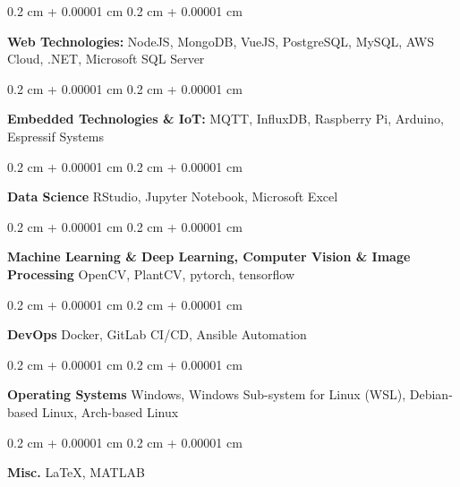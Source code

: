 \documentclass[10pt, letterpaper]{article}
\newenvironment{onecolentry}{
    \begin{adjustwidth}{
        0.2 cm + 0.00001 cm
    }{
        0.2 cm + 0.00001 cm
    }
}{
    \end{adjustwidth}
} %
\begin{document}
        \vspace{0.2 cm}

        \begin{onecolentry}
            \textbf{Web Technologies:} NodeJS, MongoDB, VueJS, PostgreSQL, MySQL, AWS Cloud, .NET, Microsoft SQL Server
        \end{onecolentry}

        \vspace{0.2 cm}

        \begin{onecolentry}
            \textbf{Embedded Technologies \& IoT:} MQTT, InfluxDB, Raspberry Pi, Arduino, Espressif Systems
        \end{onecolentry}

        \vspace{0.2 cm}

        \begin{onecolentry}
            \textbf{Data Science} RStudio, Jupyter Notebook, Microsoft Excel
        \end{onecolentry}

        \vspace{0.2 cm}

        \begin{onecolentry}
            \textbf{Machine Learning \& Deep Learning, Computer Vision \& Image Processing} OpenCV, PlantCV, pytorch, tensorflow 
        \end{onecolentry}

        \vspace{0.2 cm}

        \begin{onecolentry}
            \textbf{DevOps} Docker, GitLab CI/CD, Ansible Automation
        \end{onecolentry}

        \vspace{0.2 cm}

        \begin{onecolentry}
            \textbf{Operating Systems} Windows, Windows Sub-system for Linux (WSL), Debian-based Linux, Arch-based Linux
        \end{onecolentry}

        \vspace{0.2 cm}

        \begin{onecolentry}
            \textbf{Misc.} LaTeX, MATLAB
        \end{onecolentry}
\end{document}
